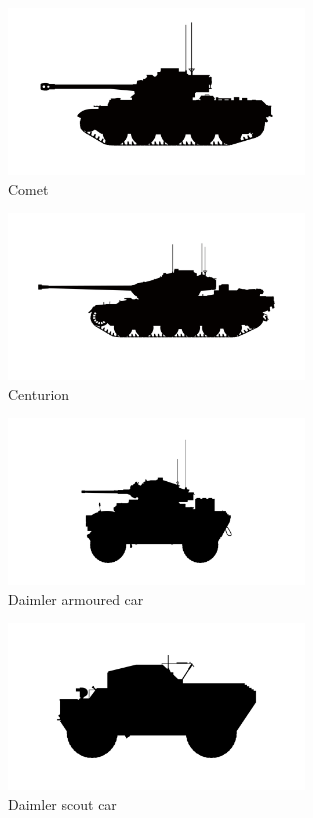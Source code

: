 \begin{figure}[h]
  \centering
  \includegraphics[width=0.7\textwidth]{platforms/comet.pdf}
  \caption*{Comet}
\end{figure}

\begin{figure}[h]
  \centering
  \includegraphics[width=0.7\textwidth]{platforms/centurion.pdf}
  \caption*{Centurion}
\end{figure}

\begin{figure}[h]
  \centering
  \includegraphics[width=0.7\textwidth]{platforms/daimler-armoured-car.pdf}
  \caption*{Daimler armoured car}
\end{figure}

\begin{figure}[h]
  \centering
  \includegraphics[width=0.7\textwidth]{platforms/daimler-scout.pdf}
  \caption*{Daimler scout car}
\end{figure}


